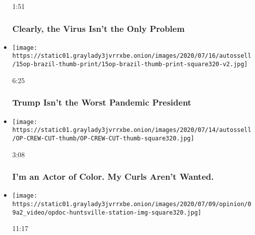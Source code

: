 \begin{itemize}
  1:51

  \hypertarget{clearly-the-virus-isnt-the-only-problem}{%
  \subsubsection{Clearly, the Virus Isn't the Only
  Problem}\label{clearly-the-virus-isnt-the-only-problem}}
\item
  \href{https://www.nytimes3xbfgragh.onion/video/opinion/100000007227771/coronavirus-covid-brazil-bolsonaro.html?action=click\&module=video-series-bar\&region=header\&pgtype=Article\&playlistId=video/opinion}{}

  \texttt{[image: https://static01.graylady3jvrrxbe.onion/images/2020/07/16/autossell/15op-brazil-thumb-print/15op-brazil-thumb-print-square320-v2.jpg]}

  6:25

  \hypertarget{trump-isnt-the-worst-pandemic-president}{%
  \subsubsection{Trump Isn't the Worst Pandemic
  President}\label{trump-isnt-the-worst-pandemic-president}}
\item
  \href{https://www.nytimes3xbfgragh.onion/video/opinion/100000007227752/hollywood-latinos-diversity.html?action=click\&module=video-series-bar\&region=header\&pgtype=Article\&playlistId=video/opinion}{}

  \texttt{[image: https://static01.graylady3jvrrxbe.onion/images/2020/07/14/autossell/OP-CREW-CUT-thumb/OP-CREW-CUT-thumb-square320.jpg]}

  3:08

  \hypertarget{im-an-actor-of-color-my-curls-arent-wanted}{%
  \subsubsection{I'm an Actor of Color. My Curls Aren't
  Wanted.}\label{im-an-actor-of-color-my-curls-arent-wanted}}
\item
  \href{https://www.nytimes3xbfgragh.onion/video/opinion/100000007080462/huntsville-station.html?action=click\&module=video-series-bar\&region=header\&pgtype=Article\&playlistId=video/opinion}{}

  \texttt{[image: https://static01.graylady3jvrrxbe.onion/images/2020/07/09/opinion/09a2\_video/opdoc-huntsville-station-img-square320.jpg]}

  11:17


\end{itemize}
